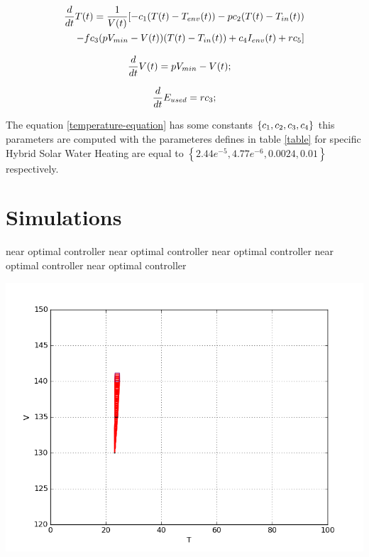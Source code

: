 
\begin{equation}
    \begin{aligned}
\frac{d}{dt}T(t) = \frac{1}{V(t)} [ -c_1(T(t)-T_{env}(t))
- p c_{2}(T(t)-T_{in}(t)) \\
- f c_{3}(pV_{min} - V(t))(T(t)-T_{in}(t))
+ c_{4}I_{env}(t)+ 
r c_{5} ]
    \end{aligned}
\label{temperature-equation}    
\end{equation}

\begin{equation}
\frac{d}{dt}V(t) = pV_{min} - V(t); \quad
\label{volume-equation}
\end{equation}

\begin{equation} 
\frac{d}{dt}E_{used} =  r c_{3} ;
\label{Energy-equation}
\end{equation}

The equation \ref{temperature-equation} has some constants $\left\lbrace 
c_1, c_{2}, c_{3}, c_{4} \right\rbrace $ this
parameters are computed with the parameteres defines in table \ref{table} for specific Hybrid Solar Water Heating
are equal to $\left\lbrace 2.44e^{-5},  4.77e^{-6}
, 0.0024, 0.01  \right\rbrace$ respectively.


\section{Simulations}

near optimal controller
near optimal controller
near optimal controller
near optimal controller
near optimal controller

\begin{minipage}{\linewidth}
\begin{center}
\includegraphics[width=1.0\linewidth]{content/ch04/1}
\end{center}
\end{minipage}

